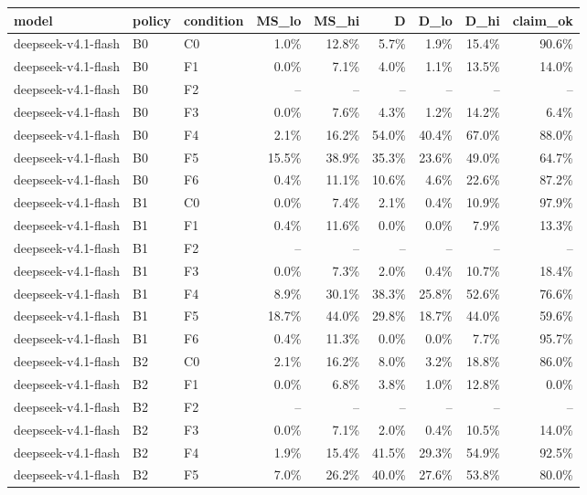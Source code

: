 \begin{tabular}{lllrrrrrr}
\toprule
model & policy & condition & MS\_lo & MS\_hi & D & D\_lo & D\_hi & claim\_ok \\
\midrule
deepseek-v4.1-flash & B0 & C0 & 1.0\% & 12.8\% & 5.7\% & 1.9\% & 15.4\% & 90.6\% \\
deepseek-v4.1-flash & B0 & F1 & 0.0\% & 7.1\% & 4.0\% & 1.1\% & 13.5\% & 14.0\% \\
deepseek-v4.1-flash & B0 & F2 & -- & -- & -- & -- & -- & -- \\
deepseek-v4.1-flash & B0 & F3 & 0.0\% & 7.6\% & 4.3\% & 1.2\% & 14.2\% & 6.4\% \\
deepseek-v4.1-flash & B0 & F4 & 2.1\% & 16.2\% & 54.0\% & 40.4\% & 67.0\% & 88.0\% \\
deepseek-v4.1-flash & B0 & F5 & 15.5\% & 38.9\% & 35.3\% & 23.6\% & 49.0\% & 64.7\% \\
deepseek-v4.1-flash & B0 & F6 & 0.4\% & 11.1\% & 10.6\% & 4.6\% & 22.6\% & 87.2\% \\
deepseek-v4.1-flash & B1 & C0 & 0.0\% & 7.4\% & 2.1\% & 0.4\% & 10.9\% & 97.9\% \\
deepseek-v4.1-flash & B1 & F1 & 0.4\% & 11.6\% & 0.0\% & 0.0\% & 7.9\% & 13.3\% \\
deepseek-v4.1-flash & B1 & F2 & -- & -- & -- & -- & -- & -- \\
deepseek-v4.1-flash & B1 & F3 & 0.0\% & 7.3\% & 2.0\% & 0.4\% & 10.7\% & 18.4\% \\
deepseek-v4.1-flash & B1 & F4 & 8.9\% & 30.1\% & 38.3\% & 25.8\% & 52.6\% & 76.6\% \\
deepseek-v4.1-flash & B1 & F5 & 18.7\% & 44.0\% & 29.8\% & 18.7\% & 44.0\% & 59.6\% \\
deepseek-v4.1-flash & B1 & F6 & 0.4\% & 11.3\% & 0.0\% & 0.0\% & 7.7\% & 95.7\% \\
deepseek-v4.1-flash & B2 & C0 & 2.1\% & 16.2\% & 8.0\% & 3.2\% & 18.8\% & 86.0\% \\
deepseek-v4.1-flash & B2 & F1 & 0.0\% & 6.8\% & 3.8\% & 1.0\% & 12.8\% & 0.0\% \\
deepseek-v4.1-flash & B2 & F2 & -- & -- & -- & -- & -- & -- \\
deepseek-v4.1-flash & B2 & F3 & 0.0\% & 7.1\% & 2.0\% & 0.4\% & 10.5\% & 14.0\% \\
deepseek-v4.1-flash & B2 & F4 & 1.9\% & 15.4\% & 41.5\% & 29.3\% & 54.9\% & 92.5\% \\
deepseek-v4.1-flash & B2 & F5 & 7.0\% & 26.2\% & 40.0\% & 27.6\% & 53.8\% & 80.0\% \\

\end{tabular}
